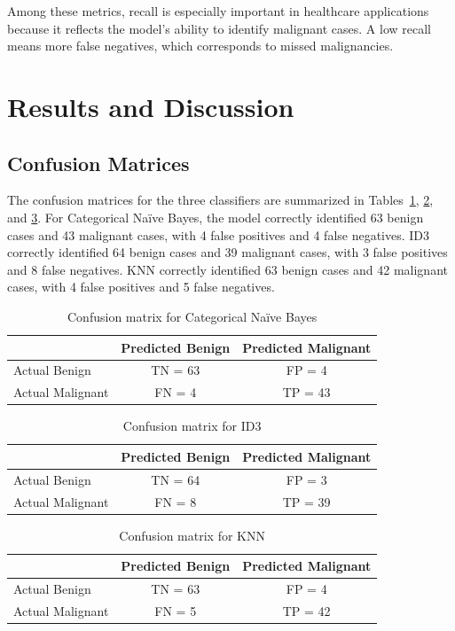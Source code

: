 \documentclass[conference]{IEEEtran}
\begin{document}
Among these metrics, recall is especially important in healthcare applications because it reflects the model's ability to identify malignant cases. A low recall means more false negatives, which corresponds to missed malignancies.

\section{Results and Discussion}
\subsection{Confusion Matrices}
The confusion matrices for the three classifiers are summarized in Tables~\ref{tab:nb}, \ref{tab:id3}, and \ref{tab:knn}. For Categorical Na\"ive Bayes, the model correctly identified 63 benign cases and 43 malignant cases, with 4 false positives and 4 false negatives. ID3 correctly identified 64 benign cases and 39 malignant cases, with 3 false positives and 8 false negatives. KNN correctly identified 63 benign cases and 42 malignant cases, with 4 false positives and 5 false negatives.

\begin{table}[!t]
\caption{Confusion matrix for Categorical Na\"ive Bayes}
\label{tab:nb}
\centering
\begin{tabular}{lcc}
\toprule
 & Predicted Benign & Predicted Malignant \\
\midrule
Actual Benign & TN = 63 & FP = 4 \\
Actual Malignant & FN = 4 & TP = 43 \\
\bottomrule
\end{tabular}
\end{table}

\begin{table}[!t]
\caption{Confusion matrix for ID3}
\label{tab:id3}
\centering
\begin{tabular}{lcc}
\toprule
 & Predicted Benign & Predicted Malignant \\
\midrule
Actual Benign & TN = 64 & FP = 3 \\
Actual Malignant & FN = 8 & TP = 39 \\
\bottomrule
\end{tabular}
\end{table}

\begin{table}[!t]
\caption{Confusion matrix for KNN}
\label{tab:knn}
\centering
\begin{tabular}{lcc}
\toprule
 & Predicted Benign & Predicted Malignant \\
\midrule
Actual Benign & TN = 63 & FP = 4 \\
Actual Malignant & FN = 5 & TP = 42 \\
\bottomrule
\end{tabular}
\end{table}
\end{document}
